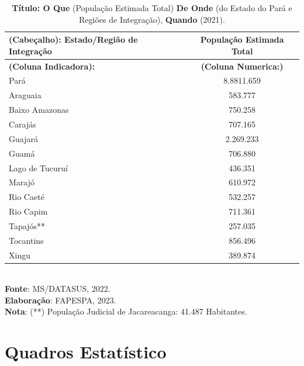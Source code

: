 \begin{table}[!htb]
    \centering
    {
    \caption{\textbf{Título: O Que} (População Estimada Total) \textbf{De Onde} (do Estado do Pará e Regiões de Integração), \textbf{Quando} (2021).}
    \label{amostras estratificada}
    \vspace{0.1cm}
\begin{tabular}{l|c}
  \hline\hline
  \textbf{(Cabeçalho)}: Estado/Região de Integração   & População Estimada Total \\
  \hline\hline
\textbf{(Coluna Indicadora):}     & \textbf{(Coluna Numerica:)}   \\
\hline
       Pará                       &  8.8811.659   \\
   Araguaia                       &   583.777    \\
   Baixo Amazonas                 &   750.258    \\
   Carajás                        &   707.165    \\
   Guajará                        & 2.269.233    \\ 
   Guamá                          & 706.880      \\
   Lago de Tucuruí                & 436.351      \\
   Marajó                         & 610.972      \\
   Rio Caeté                      & 532.257      \\
   Rio Capim                      & 711.361      \\
   Tapajós**                      & 257.035      \\
   Tocantins                      & 856.496      \\
   Xingu                          & 389.874      \\
   \hline\hline
\end{tabular}}
\\
\hspace{-7cm}
\textbf{Fonte}: MS/DATASUS, 2022. \\
\hspace{-6.9cm}
\textbf{Elaboração}: FAPESPA, 2023. \\
\hspace{-1.3cm}
\textbf{Nota}: (**) População Judicial de Jacareacanga: 41.487 Habitantes.
\end{table}


\newpage
\section{Quadros Estatístico}

